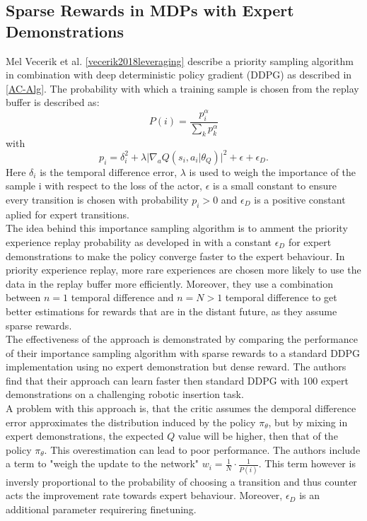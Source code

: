 \subsection{Sparse Rewards in MDPs with Expert Demonstrations}
Mel Vecerik et al. \ref{vecerik2018leveraging} describe a priority 
sampling algorithm in combination with deep deterministic policy gradient (DDPG) as described in \ref{AC-Alg}. The probability with which a 
training sample is chosen from the replay buffer is described as:
\begin{equation}
    P(i) = \frac{p_i^\alpha}{\sum\limits_{k} p_k^\alpha}
\end{equation}
with 
\begin{equation}
    p_i = \delta_{i}^2 + \lambda \lvert \nabla_a Q(s_i, a_i \vert \theta_Q) \rvert^2 + \epsilon + \epsilon_{D}.
\end{equation}
Here $\delta_{i}$ is the temporal difference error, $\lambda$ is used to weigh the importance of the sample i with respect to the loss of the actor, 
$\epsilon$ is a small constant to ensure every transition is chosen with probability $p_i > 0$ and $\epsilon_D$ is a positive constant aplied for expert transitions.\\
The idea behind this importance sampling algorithm is to amment the priority experience replay probability as developed in \cite{https://arxiv.org/pdf/1511.05952.pdf} 
with a constant $\epsilon_{D}$ for expert demonstrations to make the policy converge faster to the expert behaviour. In priority experience replay, more rare 
experiences are chosen more likely to use the data in the replay buffer more efficiently. Moreover, they use a combination between $n=1$ temporal difference and 
$n=N > 1$ temporal difference to get better estimations for rewards that are in the distant future, as they assume sparse rewards.\\
The effectiveness of the approach is demonstrated by comparing the performance of their importance sampling algorithm with sparse rewards to a standard DDPG 
implementation using no expert demonstration but dense reward. The authors find that their approach can learn faster then standard DDPG with 100 expert 
demonstrations on a challenging robotic insertion task.\\ 
A problem with this approach is, that the critic assumes the demporal difference error approximates the distribution induced by the policy $\pi_{\theta}$, but by 
mixing in expert demonstrations, the expected $Q$ value will be higher, then that of the policy $\pi_{\theta}$. This overestimation can lead to poor performance. 
The authors include a term to "weigh the update to the network" $w_i = \frac{1}{N} \cdot \frac{1}{P(i)}$. This term however is inversly proportional to the 
probability of choosing a transition and thus counter acts the improvement rate towards expert behaviour. Moreover, $\epsilon_D$ is an additional parameter requirering 
finetuning.

